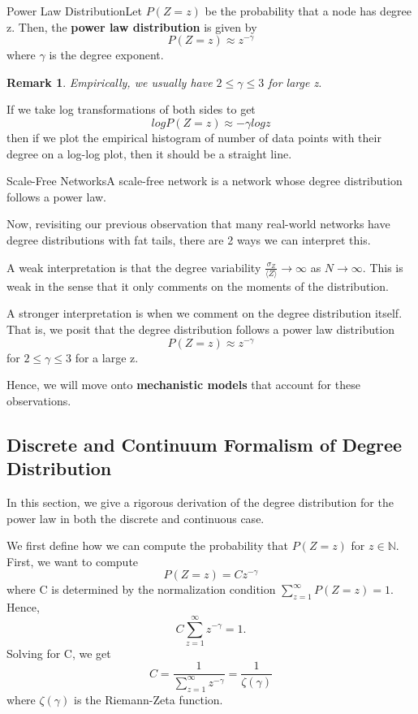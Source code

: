 \documentclass[twoside]{article}
\newtheorem{remark}[theorem]{Remark}
\begin{document}
\begin{definition_exam}{Power Law Distribution}{}Let $P(Z=z)$ be the probability that a node has degree z. Then, the \textbf{power law distribution} is given by 
$$
P(Z=z) \approx z^{-\gamma}
$$
where $\gamma$ is the degree exponent.
\end{definition_exam}

\begin{remark}Empirically, we usually have $2 \leq \gamma \leq 3$ for large z.
\end{remark}

If we take log transformations of both sides to get 
$$
log P(Z=z) \approx -\gamma log z
$$
then if we plot the empirical histogram of number of data points with their degree on a log-log plot, then it should be a straight line.

\begin{definition_exam}{Scale-Free Networks}{}A scale-free network is a network whose degree distribution follows a power law.
\end{definition_exam}

Now, revisiting our previous observation that many real-world networks have degree distributions with fat tails, there are 2 ways we can interpret this.

A weak interpretation is that the degree variability $\frac{\sigma_Z}{\langle Z \rangle} \rightarrow \infty$ as $N \rightarrow \infty$. This is weak in the sense that it only comments on the moments of the distribution.

A stronger interpretation is when we comment on the degree distribution itself. That is, we posit that the degree distribution follows a power law distribution 
$$
P(Z = z) \approx z^{-\gamma}
$$
for $2 \leq \gamma \leq 3$ for a large z.

Hence, we will move onto \textbf{mechanistic models} that account for these observations.



\subsection{Discrete and Continuum Formalism of Degree Distribution}
In this section, we give a rigorous derivation of the degree distribution for the power law in both the discrete and continuous case.

We first define how we can compute the probability that $P(Z=z)$ for $z \in \mathbb{N}$. First, we want to compute 
$$
P(Z=z) = Cz^{-\gamma}
$$
where C is determined by the normalization condition $\sum_{z=1}^{\infty}P(Z=z) = 1.$ Hence,
$$
C\sum_{z=1}^{\infty}z^{-\gamma} = 1.
$$
Solving for C, we get 
$$
C = \frac{1}{\sum_{z=1}^{\infty}z^{-\gamma}} = \frac{1}{\zeta (\gamma)}
$$
where $\zeta(\gamma)$ is the Riemann-Zeta function.
\end{document}
